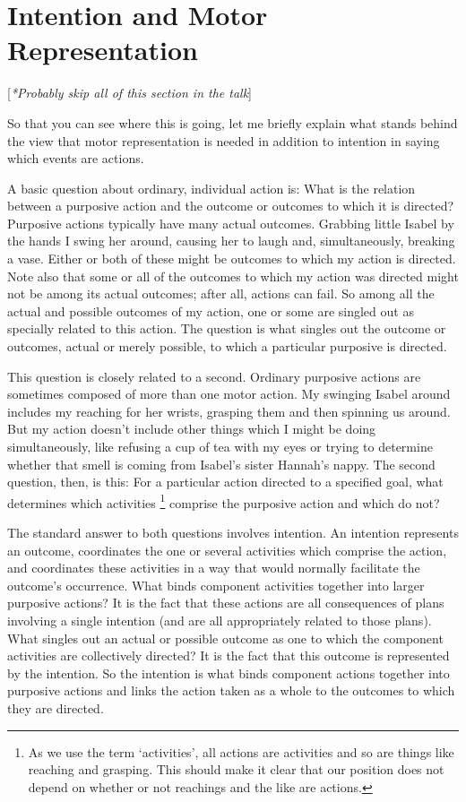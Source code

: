 \documentclass[12pt,\papersize]{extarticle}
\begin{document}
\section{Intention and Motor Representation}
[\emph{*Probably skip all of this section in the talk}]

So that you can see where this is going, let me briefly explain what stands behind the view that motor representation is needed in addition to intention in saying which events are actions.

A basic question about ordinary, individual action is:
What is the relation between a purposive action and the outcome or outcomes to which it is directed?
Purposive actions typically have many actual outcomes.
Grabbing little Isabel by the hands I swing her around, causing her to laugh and, simultaneously, breaking a vase.
Either or both of these might be outcomes to which my action is directed.
Note also that some or all of the outcomes to which my action was directed might not be among its actual outcomes; after all, actions can fail.
So among all the actual and possible outcomes of my action, one or some are singled out as specially related to this action.
The question is what singles out the outcome or outcomes, actual or merely possible, to which a particular purposive is directed.

This question is closely related to a second.
Ordinary purposive actions are sometimes composed of more than one motor action.  My swinging Isabel around includes my reaching for her wrists, grasping them and then spinning us around.  
But  my action doesn’t include other things which I might be doing simultaneously, like refusing a cup of tea with my eyes or  trying to determine whether that smell is coming from Isabel’s sister Hannah’s nappy.
The second question, then, is this: For a particular action directed to a specified goal, what determines which activities%
\footnote{
As we use the term `activities',
all actions are activities 
and so are  things like reaching and grasping.
This should make it clear that our position does not depend on whether or not reachings and the like are  actions.
} 
comprise the purposive action and which do not?

The standard answer to both questions involves intention.
An intention represents an outcome, coordinates the one or several activities which comprise the action, and coordinates these activities in a way that would normally facilitate the outcome's occurrence.
What binds component activities together into larger purposive actions?  
It is the fact that these actions are all consequences of plans involving a single intention (and are all appropriately related to those plans).
What singles out an actual or possible outcome as one to which the component activities are collectively directed?  
It is the fact that this outcome is represented by the intention.
So the intention is what binds component actions together into purposive actions and links the action taken as a whole to the outcomes to which they are directed.
\end{document}
